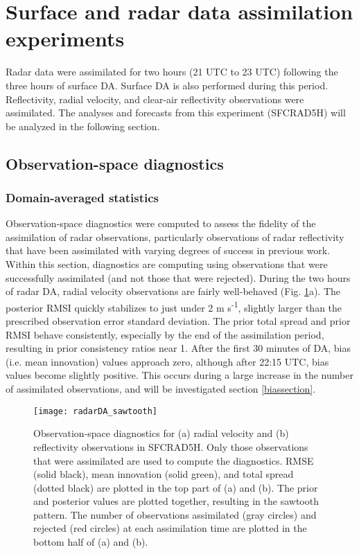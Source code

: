 \section{Surface and radar data assimilation experiments}
Radar data were assimilated for two hours (21 UTC to 23 UTC) following the three hours of surface DA. Surface DA is also performed during this period. Reflectivity, radial velocity, and clear-air reflectivity observations were assimilated. The analyses and forecasts from this experiment (SFCRAD5H) will be analyzed in the following section.
\subsection{Observation-space diagnostics}
\subsubsection{Domain-averaged statistics}
Observation-space diagnostics were computed to assess the fidelity of the assimilation of radar observations, particularly observations of radar reflectivity that have been assimilated with varying degrees of success in previous work. Within this section, diagnostics are computing using observations that were successfully assimilated (and not those that were rejected). During the two hours of radar DA, radial velocity observations are fairly well-behaved (Fig. \ref{sawtooth}a). The posterior RMSI quickly stabilizes to just under 2 m s\textsuperscript{-1}, slightly larger than the prescribed observation error standard deviation. The prior total spread and prior RMSI behave consistently, especially by the end of the assimilation period, resulting in prior consistency ratios near 1. After the first 30 minutes of DA, bias (i.e. mean innovation) values approach zero, although after 22:15 UTC, bias values become slightly positive. This occurs during a large increase in the number of assimilated observations, and will be investigated section \ref{biassection}.

\begin{figure}
\centering
\texttt{[image: radarDA\_sawtooth]}
\caption{Observation-space diagnostics for (a) radial velocity and (b) reflectivity observations in SFCRAD5H. Only those observations that were assimilated are used to compute the diagnostics. RMSE (solid black), mean innovation (solid green), and total spread (dotted black) are plotted in the top part of (a) and (b). The prior and posterior values are plotted together, resulting in the sawtooth pattern. The number of observations assimilated (gray circles) and rejected (red circles) at each assimilation time are plotted in the bottom half of (a) and (b).}
\label{sawtooth}
\end{figure}

